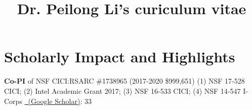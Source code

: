 \documentclass[11pt]{moderncv}
\title{Dr. Peilong Li's curiculum vitae}
\begin{document}
\maketitle

\section{Scholarly Impact and Highlights}
%
{\small \textbf{Co-PI} of NSF CICI:RSARC \#1738965 (2017-2020 \$999,651)}
%
%
{\small (1) NSF 17-528 CICI; \newline (2) Intel Academic Grant 2017; \newline
(3) NSF 16-533 CICI; \newline (4) NSF 14-547 I-Corps}
%
%
{\small \href{https://scholar.google.com/citations?user=wFIBx94AAAAJ&hl}
  {\color{color2}\homepagesymbol~(Google Scholar)}: 33}
%
\end{document}
